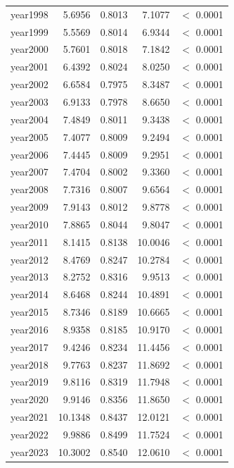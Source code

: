 \begin{table}[H]
\begin{tabular}{lrrrr}
      year1998 & 5.6956 & 0.8013 & 7.1077 & $<$ 0.0001 \\ 
      year1999 & 5.5569 & 0.8014 & 6.9344 & $<$ 0.0001 \\ 
      year2000 & 5.7601 & 0.8018 & 7.1842 & $<$ 0.0001 \\ 
      year2001 & 6.4392 & 0.8024 & 8.0250 & $<$ 0.0001 \\ 
      year2002 & 6.6584 & 0.7975 & 8.3487 & $<$ 0.0001 \\ 
      year2003 & 6.9133 & 0.7978 & 8.6650 & $<$ 0.0001 \\ 
      year2004 & 7.4849 & 0.8011 & 9.3438 & $<$ 0.0001 \\ 
      year2005 & 7.4077 & 0.8009 & 9.2494 & $<$ 0.0001 \\ 
      year2006 & 7.4445 & 0.8009 & 9.2951 & $<$ 0.0001 \\ 
      year2007 & 7.4704 & 0.8002 & 9.3360 & $<$ 0.0001 \\ 
      year2008 & 7.7316 & 0.8007 & 9.6564 & $<$ 0.0001 \\ 
      year2009 & 7.9143 & 0.8012 & 9.8778 & $<$ 0.0001 \\ 
      year2010 & 7.8865 & 0.8044 & 9.8047 & $<$ 0.0001 \\ 
      year2011 & 8.1415 & 0.8138 & 10.0046 & $<$ 0.0001 \\ 
      year2012 & 8.4769 & 0.8247 & 10.2784 & $<$ 0.0001 \\ 
      year2013 & 8.2752 & 0.8316 & 9.9513 & $<$ 0.0001 \\ 
      year2014 & 8.6468 & 0.8244 & 10.4891 & $<$ 0.0001 \\ 
      year2015 & 8.7346 & 0.8189 & 10.6665 & $<$ 0.0001 \\ 
      year2016 & 8.9358 & 0.8185 & 10.9170 & $<$ 0.0001 \\ 
      year2017 & 9.4246 & 0.8234 & 11.4456 & $<$ 0.0001 \\ 
      year2018 & 9.7763 & 0.8237 & 11.8692 & $<$ 0.0001 \\ 
      year2019 & 9.8116 & 0.8319 & 11.7948 & $<$ 0.0001 \\ 
      year2020 & 9.9146 & 0.8356 & 11.8650 & $<$ 0.0001 \\ 
      year2021 & 10.1348 & 0.8437 & 12.0121 & $<$ 0.0001 \\ 
      year2022 & 9.9886 & 0.8499 & 11.7524 & $<$ 0.0001 \\ 
      year2023 & 10.3002 & 0.8540 & 12.0610 & $<$ 0.0001 \\ 
       \hline

\end{tabular}
\end{table}
